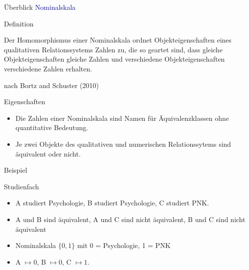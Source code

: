 \documentclass[
  8pt,
  ignorenonframetext,
]{beamer}
\providecommand{\tightlist}{%
  \setlength{\itemsep}{0pt}\setlength{\parskip}{0pt}}
\begin{document}
\begin{frame}{Überblick}
\protect\hypertarget{uxfcberblick-9}{}
\textcolor{darkblue}{Nominalskala}

Definition

\small

Der Homomorphismus einer Nominalskala ordnet Objekteigenschaften eines
qualitativen Relationssystems Zahlen zu, die so geartet sind, dass
gleiche Objekteigenschaften gleiche Zahlen und verschiedene
Objekteigenschaften verschiedene Zahlen erhalten.

\footnotesize
\flushright

nach Bortz and Schuster (2010)

\justifying
\normalsize

Eigenschaften

\small

\begin{itemize}
\tightlist
\item
  Die Zahlen einer Nominalskala sind Namen für Äquivalenzklassen ohne
  quantitative Bedeutung.
\item
  Je zwei Objekte des qualitativen und numerischen Relationssytems sind
  äquivalent oder nicht.
\end{itemize}

\normalsize

Beispiel

\small

Studienfach

\begin{itemize}
\tightlist
\item
  A studiert Psychologie, B studiert Psychologie, C studiert PNK.
\item
  A und B sind äquivalent, A und C sind nicht äquivalent, B und C sind
  nicht äquivalent
\item
  Nominalskala \(\{0,1\}\) mit 0 = Psychologie, 1 = PNK
\item
  A \(\mapsto 0\), B \(\mapsto 0\), C \(\mapsto 1\).
\end{itemize}
\end{frame}
\end{document}

